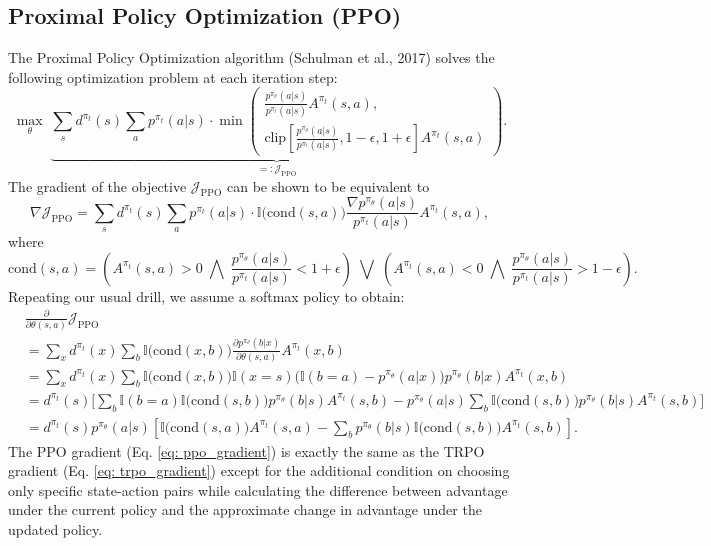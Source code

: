 \documentclass[a4paper, 10pt]{article}
\begin{document}
\subsection{Proximal Policy Optimization (PPO)}
The Proximal Policy Optimization algorithm (Schulman et al., 2017) solves the following optimization problem at each iteration step:
\begin{equation}
  \max_\theta \; \underbrace{\sum_s d^{\pi_t}(s) \sum_a p^{\pi_t}(a | s) \cdot \min \left( \begin{matrix} \frac{p^{\pi_\theta}(a | s)}{p^{\pi_t}(a | s)} A^{\pi_t}(s, a), \\ \text{clip} \left[\frac{p^{\pi_\theta}(a | s)}{p^{\pi_t}(a | s)}, 1 - \epsilon, 1 + \epsilon \right] A^{\pi_t}(s, a) \end{matrix} \right)}_{=: \mathcal{J}_{\text{PPO}}}.
\end{equation}
The gradient of the objective $\mathcal{J}_{\text{PPO}}$ can be shown to be equivalent to
\begin{equation}
  \nabla \mathcal{J}_{\text{PPO}} = \sum_s d^{\pi_t}(s) \sum_a p^{\pi_t}(a | s) \cdot \mathbb{I} \Big( \text{cond}(s, a) \Big) \frac{\nabla p^{\pi_\theta}(a | s)}{p^{\pi_t}(a | s)} A^{\pi_t}(s, a),
\end{equation}
where 
\begin{equation}
  \text{cond}(s, a) = \left( A^{\pi_t}(s, a) > 0 \;\bigwedge\; \frac{p^{\pi_\theta}(a | s)}{p^{\pi_t}(a | s)} < 1 + \epsilon \right) \;\bigvee\; \left( A^{\pi_t}(s, a) < 0 \;\bigwedge\; \frac{p^{\pi_\theta}(a | s)}{p^{\pi_t}(a | s)} > 1 - \epsilon \right).
\end{equation}
Repeating our usual drill, we assume a softmax policy to obtain:
\begin{align}
  & \frac{\partial}{\partial \theta(s, a)} \mathcal{J}_{\text{PPO}} \nonumber \\
  &= \sum_x d^{\pi_t}(x) \sum_b \mathbb{I} \Big( \text{cond}(x, b) \Big) \frac{\partial p^{\pi_\theta}(b | x)}{\partial \theta(s, a)} A^{\pi_t}(x, b) \nonumber \\
  &= \sum_x d^{\pi_t}(x) \sum_b \mathbb{I} \Big( \text{cond}(x, b) \Big) \mathbb{I}(x = s) \Big( \mathbb{I}(b = a) - p^{\pi_\theta}(a | x) \Big) p^{\pi_\theta}(b | x) A^{\pi_t}(x, b) \nonumber \\
  &= d^{\pi_t}(s) \Bigg[ \sum_b \mathbb{I}(b = a) \mathbb{I} \Big( \text{cond}(s, b) \Big) p^{\pi_\theta}(b | s) A^{\pi_t}(s, b) - p^{\pi_\theta}(a | s) \sum_b \mathbb{I} \Big( \text{cond}(s, b) \Big) p^{\pi_\theta}(b | s) A^{\pi_t}(s, b) \Bigg] \nonumber \\
    &= d^{\pi_t}(s) p^{\pi_\theta}(a | s) \left[ \mathbb{I} \Big( \text{cond}(s, a) \Big) A^{\pi_t}(s, a) - \sum_b p^{\pi_\theta}(b | s) \mathbb{I} \Big( \text{cond}(s, b) \Big) A^{\pi_t}(s, b) \right]. \label{eq: ppo_gradient}
\end{align}
The PPO gradient (Eq. \ref{eq: ppo_gradient}) is exactly the same as the TRPO gradient (Eq. \ref{eq: trpo_gradient}) except for the additional condition on choosing only specific state-action pairs while calculating the difference between advantage under the current policy and the approximate change in advantage under the updated policy.
\end{document}
